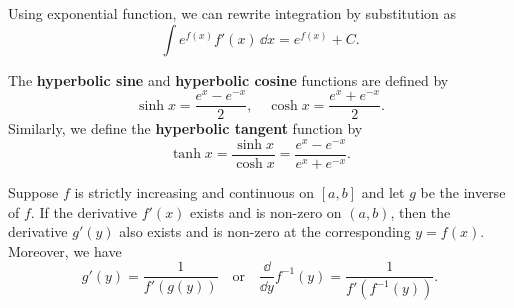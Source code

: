 \documentclass[a4paper]{ctexart}
\begin{document}
	\begin{mymthd}
		Using exponential function, we can rewrite integration by substitution as
		\[
		\int e^{f(x)} f'(x)\, \dd x = e^{f(x)} + C.
		\]
	\end{mymthd}
	\begin{mydef}
		The \textbf{hyperbolic sine} and \textbf{hyperbolic cosine} functions are defined by
		\[
		\sinh x = \frac{e^x - e^{-x}}{2}, \quad \cosh x = \frac{e^x + e^{-x}}{2}.
		\]
		Similarly, we define the \textbf{hyperbolic tangent} function by
		\[
		\tanh x = \frac{\sinh x}{\cosh x} = \frac{e^x - e^{-x}}{e^x + e^{-x}}.
		\]
	\end{mydef}
    \begin{mythm}
        Suppose $f$ is strictly increasing and continuous on $[a,b]$ and let $g$ be the inverse of $f$. If the derivative $f'(x)$ exists and is non-zero on $(a,b)$, then the derivative $g'(y)$ also exists and is non-zero at the corresponding $y=f(x)$. Moreover, we have
        \[
        g'(y) = \frac{1}{f'(g(y))} \quad \text{or}\quad \frac{\dd}{\dd y} f^{-1}(y) = \frac{1}{f'(f^{-1}(y))}.
        \]
    \end{mythm}
\end{document}
